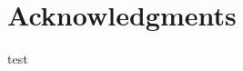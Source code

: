 \documentclass[]{report}
\title{}
\author{}
\begin{document}
\maketitle

\begin{abstract}
\end{abstract}

	\section{Acknowledgments}
test
\end{document}
